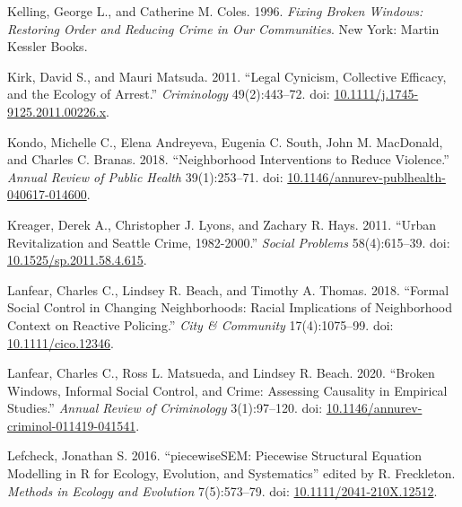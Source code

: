 \documentclass [11pt, proquest] {uwthesis}[2015/03/03]
\newlength{\cslhangindent}
\newenvironment{CSLReferences}[2]%
{\setlength{\parindent}{0pt}%
\everypar{\setlength{\hangindent}{\cslhangindent}}\ignorespaces}%
{\par}
\begin{document}
\begin{CSLReferences}{1}{0}
\leavevmode\hypertarget{ref-kellingFixingBrokenWindows1996}{}%
Kelling, George L., and Catherine M. Coles. 1996. \emph{Fixing {Broken Windows}: {Restoring Order} and {Reducing Crime} in Our {Communities}}. {New York}: {Martin Kessler Books}.

\leavevmode\hypertarget{ref-kirkLegalCynicismCollective2011}{}%
Kirk, David S., and Mauri Matsuda. 2011. {``Legal {Cynicism}, {Collective Efficacy}, and the {Ecology} of {Arrest}.''} \emph{Criminology} 49(2):443--72. doi: \href{https://doi.org/10.1111/j.1745-9125.2011.00226.x}{10.1111/j.1745-9125.2011.00226.x}.

\leavevmode\hypertarget{ref-kondoNeighborhoodInterventionsReduce2018}{}%
Kondo, Michelle C., Elena Andreyeva, Eugenia C. South, John M. MacDonald, and Charles C. Branas. 2018. {``Neighborhood {Interventions} to {Reduce Violence}.''} \emph{Annual Review of Public Health} 39(1):253--71. doi: \href{https://doi.org/10.1146/annurev-publhealth-040617-014600}{10.1146/annurev-publhealth-040617-014600}.

\leavevmode\hypertarget{ref-kreagerUrbanRevitalizationSeattle2011a}{}%
Kreager, Derek A., Christopher J. Lyons, and Zachary R. Hays. 2011. {``Urban {Revitalization} and {Seattle Crime}, 1982-2000.''} \emph{Social Problems} 58(4):615--39. doi: \href{https://doi.org/10.1525/sp.2011.58.4.615}{10.1525/sp.2011.58.4.615}.

\leavevmode\hypertarget{ref-lanfearFormalSocialControl2018a}{}%
Lanfear, Charles C., Lindsey R. Beach, and Timothy A. Thomas. 2018. {``Formal {Social Control} in {Changing Neighborhoods}: {Racial Implications} of {Neighborhood Context} on {Reactive Policing}.''} \emph{City \& Community} 17(4):1075--99. doi: \href{https://doi.org/10.1111/cico.12346}{10.1111/cico.12346}.

\leavevmode\hypertarget{ref-lanfearBrokenWindowsInformal2020}{}%
Lanfear, Charles C., Ross L. Matsueda, and Lindsey R. Beach. 2020. {``Broken {Windows}, {Informal Social Control}, and {Crime}: {Assessing Causality} in {Empirical Studies}.''} \emph{Annual Review of Criminology} 3(1):97--120. doi: \href{https://doi.org/10.1146/annurev-criminol-011419-041541}{10.1146/annurev-criminol-011419-041541}.

\leavevmode\hypertarget{ref-lefcheckPiecewiseSEMPiecewiseStructural2016}{}%
Lefcheck, Jonathan S. 2016. {``{piecewiseSEM}: {Piecewise} Structural Equation Modelling in {R} for Ecology, Evolution, and Systematics''} edited by R. Freckleton. \emph{Methods in Ecology and Evolution} 7(5):573--79. doi: \href{https://doi.org/10.1111/2041-210X.12512}{10.1111/2041-210X.12512}.


\end{CSLReferences}
\end{document}
